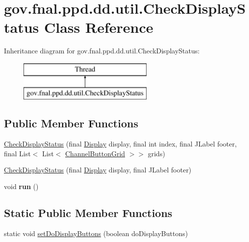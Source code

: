 \hypertarget{classgov_1_1fnal_1_1ppd_1_1dd_1_1util_1_1CheckDisplayStatus}{\section{gov.\-fnal.\-ppd.\-dd.\-util.\-Check\-Display\-Status Class Reference}
\label{classgov_1_1fnal_1_1ppd_1_1dd_1_1util_1_1CheckDisplayStatus}
}
Inheritance diagram for gov.\-fnal.\-ppd.\-dd.\-util.\-Check\-Display\-Status\-:\begin{figure}[H]
\begin{center}
\leavevmode
\includegraphics[height=2.000000cm]{classgov_1_1fnal_1_1ppd_1_1dd_1_1util_1_1CheckDisplayStatus}
\end{center}
\end{figure}
\subsection*{Public Member Functions}
\begin{DoxyCompactItemize}
\item 
\hyperlink{classgov_1_1fnal_1_1ppd_1_1dd_1_1util_1_1CheckDisplayStatus_a3890e0132381faef60300b15cdb31799}{Check\-Display\-Status} (final \hyperlink{interfacegov_1_1fnal_1_1ppd_1_1dd_1_1signage_1_1Display}{Display} display, final int index, final J\-Label footer, final List$<$ List$<$ \hyperlink{classgov_1_1fnal_1_1ppd_1_1dd_1_1changer_1_1ChannelButtonGrid}{Channel\-Button\-Grid} $>$$>$ grids)
\item 
\hyperlink{classgov_1_1fnal_1_1ppd_1_1dd_1_1util_1_1CheckDisplayStatus_a28d73456a98abac8a539720c23149161}{Check\-Display\-Status} (final \hyperlink{interfacegov_1_1fnal_1_1ppd_1_1dd_1_1signage_1_1Display}{Display} display, final J\-Label footer)
\item 
\hypertarget{classgov_1_1fnal_1_1ppd_1_1dd_1_1util_1_1CheckDisplayStatus_a3961834b92c8dbca9dbc0b6b6f2c07a0}{void {\bfseries run} ()}\label{classgov_1_1fnal_1_1ppd_1_1dd_1_1util_1_1CheckDisplayStatus_a3961834b92c8dbca9dbc0b6b6f2c07a0}

\end{DoxyCompactItemize}
\subsection*{Static Public Member Functions}
\begin{DoxyCompactItemize}
\item 
static void \hyperlink{classgov_1_1fnal_1_1ppd_1_1dd_1_1util_1_1CheckDisplayStatus_a4fca2b5bbab254e7d90d70f87de8ce41}{set\-Do\-Display\-Buttons} (boolean do\-Display\-Buttons)
\end{DoxyCompactItemize}


